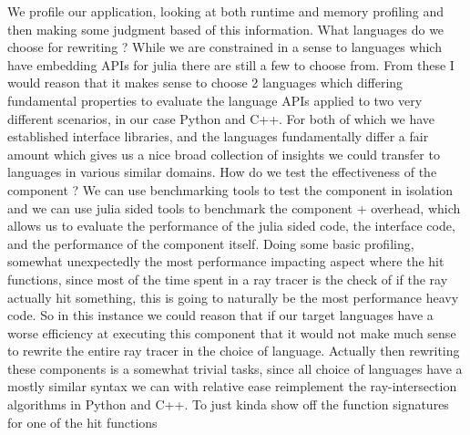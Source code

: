{}\markdownRendererBlockQuoteBegin
We profile our application, looking at both runtime and memory profiling and then making some judgment based of this information. 
\markdownRendererBlockQuoteEnd \markdownRendererInterblockSeparator
{}\markdownRendererUlBegin
\markdownRendererUlItem What languages do we choose for rewriting ? \markdownRendererInterblockSeparator
{}\markdownRendererBlockQuoteBegin
While we are constrained in a sense to languages which have embedding APIs for julia there are still a few to choose from. From these I would reason that it makes sense to choose 2 languages which differing fundamental properties to evaluate the language APIs applied to two very different scenarios, in our case Python and C++. For both of which we have established interface libraries, and the languages fundamentally differ a fair amount which gives us a nice broad collection of insights we could transfer to languages in various similar domains.
\markdownRendererBlockQuoteEnd \markdownRendererUlItemEnd 
\markdownRendererUlItem How do we test the effectiveness of the component ?\markdownRendererInterblockSeparator
{}\markdownRendererBlockQuoteBegin
We can use benchmarking tools to test the component in isolation and we can use julia sided tools to benchmark the component + overhead, which allows us to evaluate the performance of the julia sided code, the interface code, and the performance of the component itself.
\markdownRendererBlockQuoteEnd \markdownRendererUlItemEnd 
\markdownRendererUlEnd \markdownRendererInterblockSeparator
{}\markdownRendererInterblockSeparator
{}Doing some basic profiling, somewhat unexpectedly the most performance impacting aspect where the hit functions, since most of the time spent in a ray tracer is the check of if the ray actually hit something, this is going to naturally be the most performance heavy code. \markdownRendererInterblockSeparator
{}So in this instance we could reason that if our target languages have a worse efficiency at executing this component that it would not make much sense to rewrite the entire ray tracer in the choice of language.\markdownRendererInterblockSeparator
{}Actually then rewriting these components is a somewhat trivial tasks, since all choice of languages have a mostly similar syntax we can with relative ease reimplement the ray-intersection algorithms in Python and C++.\markdownRendererInterblockSeparator
{}To just kinda show off the function signatures for one of the hit functions \markdownRendererInterblockSeparator
